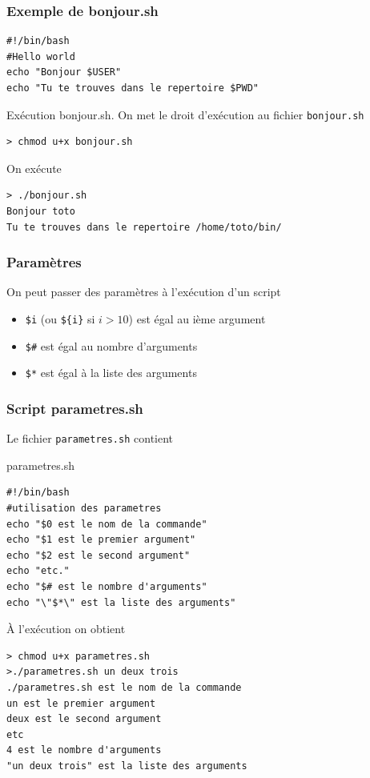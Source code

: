 \documentclass{beamer}
\newenvironment{terminal}{\color{white}\begin{snugshade*}}
{\end{snugshade*}\color{black}}
\begin{document}
\begin{frame}[fragile]
\frametitle{Exemple de bonjour.sh}
\begin{block}{}
\begin{verbatim}
#!/bin/bash
#Hello world
echo "Bonjour $USER"
echo "Tu te trouves dans le repertoire $PWD"
\end{verbatim}
\end{block}

Exécution bonjour.sh. On met le droit d'exécution au fichier \verb|bonjour.sh|
\begin{terminal}
\begin{verbatim}
> chmod u+x bonjour.sh
\end{verbatim}
\end{terminal}
On exécute
\begin{terminal}
\begin{verbatim}
> ./bonjour.sh
Bonjour toto
Tu te trouves dans le repertoire /home/toto/bin/
\end{verbatim}
\end{terminal}
\end{frame}



\begin{frame}[fragile]
\frametitle{Paramètres}
On peut passer des paramètres à l'exécution d'un script
\begin{itemize}
\item \verb|$i| (ou \verb|${i}| si $i > 10$) est égal au ième argument
\item \verb|$#| est égal au nombre d'arguments
\item \verb|$*| est égal à la liste des arguments
\end{itemize}
\end{frame}

\begin{frame}[fragile]
\frametitle{Script parametres.sh}
Le fichier \verb|parametres.sh| contient
\begin{scriptsize}
\begin{block}{parametres.sh}
\begin{verbatim}
#!/bin/bash
#utilisation des parametres
echo "$0 est le nom de la commande"
echo "$1 est le premier argument"
echo "$2 est le second argument"
echo "etc."
echo "$# est le nombre d'arguments"
echo "\"$*\" est la liste des arguments"
\end{verbatim}
\end{block}
\end{scriptsize}

À l'exécution on obtient
\begin{scriptsize}
\begin{terminal}
\begin{verbatim}
> chmod u+x parametres.sh
>./parametres.sh un deux trois
./parametres.sh est le nom de la commande
un est le premier argument
deux est le second argument
etc
4 est le nombre d'arguments
"un deux trois" est la liste des arguments
\end{verbatim}
\end{terminal}
\end{scriptsize}
\end{frame}
\end{document}
